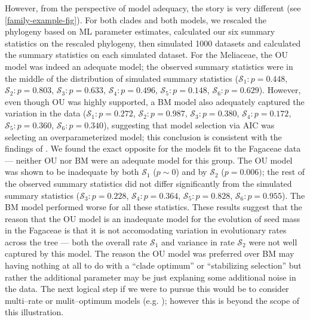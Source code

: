 \documentclass[a4paper,12pt]{article}
\begin{document}
However, from the perspective of model adequacy, the story is very different (see \ref{family-example-fig}). For both clades and both models, we rescaled the phylogeny based on ML parameter estimates, calculated our six summary statistics on the rescaled phylogeny, then simulated 1000 datasets and calculated the summary statistics on each simulated dataset. For the Meliaceae, the OU model was indeed an adequate model; the observed summary statistics were in the middle of the distribution of simulated summary statistics ($\mathcal{S}_1: p=0.448$, $\mathcal{S}_2: p=0.803$, $\mathcal{S}_3: p=0.633$, $\mathcal{S}_4:p=0.496$, $\mathcal{S}_5: p=0.148$, $\mathcal{S}_6: p=0.629$). However, even though OU was highly supported, a BM model also adequately captured the variation in the data ($\mathcal{S}_1: p=0.272$, $\mathcal{S}_2: p=0.987$, $\mathcal{S}_3: p=0.380$, $\mathcal{S}_4:p=0.172$, $\mathcal{S}_5: p=0.360$, $\mathcal{S}_6: p=0.340$), suggesting that model selection via AIC was selecting an overparameterized model; this conclusion is consistent with the findings of \citet{Boettiger2012}. We found the exact opposite for the models fit to the Fagaceae data --- neither OU nor BM were an adequate model for this group. The OU model was shown to be inadequate by both $\mathcal{S}_1$ ($p \sim 0$) and by $\mathcal{S}_2$ ($p=0.006)$; the rest of the observed summary statistics did not differ significantly from the simulated summary statistics ($\mathcal{S}_3: p=0.228$, $\mathcal{S}_4:p=0.364$, $\mathcal{S}_5: p=0.828$, $\mathcal{S}_6: p=0.955$). The BM model performed worse for all these statistics. These results suggest that the reason that the OU model is an inadequate model for the evolution of seed mass in the Fagaceae is that it is not accomodating variation in evolutionary rates across the tree --- both the overall rate $\mathcal{S}_1$ and variance in rate $\mathcal{S}_2$ were not well captured by this model. The reason the OU model was preferred over BM may having nothing at all to do with a ``clade optimum'' or ``stabilizing selection'' but rather the additional parameter may be just explaning some additional noise in the data. The next logical step if we were to pursue this would be to consider multi--rate or mulit--optimum models (e.g. \citep{Omeara2006, Eastman2011, Beaulieu2012}); however this is beyond the scope of this illustration.
\end{document}
